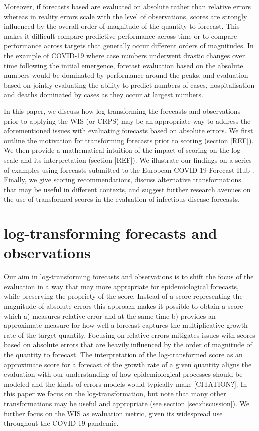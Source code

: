 \documentclass{article}
\begin{document}
Moreover, if forecasts based are evaluated on absolute rather than relative errors whereas in reality errors scale with the level of observations, scores are strongly influenced by the overall order of magnitude of the quantity to forecast.
This makes it difficult compare predictive performance across time or to compare performance across targets that generally occur different orders of magnitudes.
In the example of COVID-19 where case numbers underwent drastic changes over time following the initial emergence, forecast evaluation based on the absolute numbers would be dominated by performance around the peaks, and evaluation based on jointly evaluating the ability to predict numbers of cases, hospitalisation and deaths dominated by cases as they occur at largest numbers.

In this paper, we discuss how log-transforming the forecasts and observations prior to applying the WIS (or CRPS) may be an appropriate way to address the aforementioned issues with evaluating forecasts based on absolute errors. We first outline the motivation for transforming forecasts prior to scoring (section [REF]). We then provide a mathematical intuition of the impact of scoring on the log scale and its interpretation (section [REF]). We illustrate our findings on a series of examples using forecasts submitted to the European COVID-19 Forecast Hub  \citep{europeancovid-19forecasthubEuropeanCovid19Forecast2021, sherrattPredictivePerformanceMultimodel2022}. Finally, we give scoring recommendations, discuss alternative transformations that may be useful in different contexts, and suggest further research avenues on the use of transformed scores in the evaluation of infectious disease forecasts. 


\section{log-transforming forecasts and observations}

Our aim in log-transforming forecasts and observations is to shift the focus of the evaluation in a way that may more appropriate for epidemiological forecasts, while preserving the propriety of the score. Instead of a score representing the magnitude of absolute errors this approach makes it possible to obtain a score which a) measures relative error and at the same time b) provides an approximate measure for how well a forecast captures the multiplicative growth rate of the target quantity. Focusing on relative errors mitigates issues with scores based on absolute errors that are heavily influenced by the order of magnitude of the quantity to forecast. The interpretation of the log-transformed score as an approximate score for a forecast of the growth rate of a given quantity aligns the evaluation with our understanding of how epidemiological processes should be modeled and the kinds of errors models would typically make [CITATION?]. In this paper we focus on the log-transformation, but note that many other transformations may be useful and appropriate (see section \ref{sec:discussion}).
We further focus on the WIS as evaluation metric, given its widespread use throughout the COVID-19 pandemic.
\end{document}

